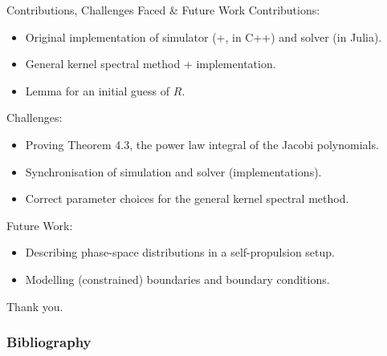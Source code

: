 \documentclass[aspectratio=169, hyperref={colorlinks=true}]{beamer}
\begin{document}
  \begin{frame}{Contributions, Challenges Faced \& Future Work}
    Contributions:
    \begin{itemize}
      \tightlist
      \item Original implementation of simulator (+, in C++) and solver (in Julia).
      \item General kernel spectral method + implementation.
      \item Lemma for an initial guess of $R$.
    \end{itemize}

    Challenges:
    \begin{itemize}
      \tightlist
      \item Proving Theorem 4.3, the power law integral of the Jacobi polynomials.
      \item Synchronisation of simulation and solver (implementations).
      \item Correct parameter choices for the general kernel spectral method.
    \end{itemize}

    Future Work:
    \begin{itemize}
      \tightlist
      \item Describing phase-space distributions in a self-propulsion setup.
      \item Modelling (constrained) boundaries and boundary conditions.
    \end{itemize}
  \end{frame}

  \begin{frame}{}
    Thank you.
  \end{frame}

  \begin{frame}[allowframebreaks]
    \frametitle{Bibliography}
    \printbibliography[heading=bibnumbered]
    \printnoidxglossary[type=acronym, title={Acronyms}]
  \end{frame}
\end{document}
